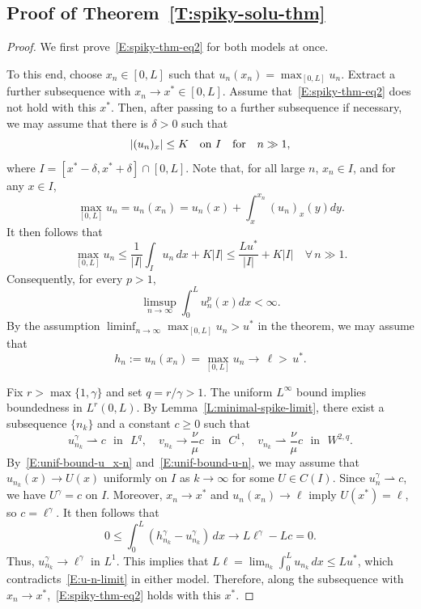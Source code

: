 \documentclass[11pt]{article} %
\theoremstyle{remark}
\theoremstyle{remark}
\numberwithin{equation}{section}
\numberwithin{figure}{section}
\numberwithin{table}{section}
\begin{document}
\subsection{Proof of Theorem~\ref{T:spiky-solu-thm}}


\begin{proof}
  We first prove~\eqref{E:spiky-thm-eq2} for both models at once.

  To this end, choose $x_n \in [0, L]$ such that $u_n(x_n) = \max_{[0,L]}u_n$.
  Extract a further subsequence with $x_n \to x^* \in [0, L]$. Assume
  that~\eqref{E:spiky-thm-eq2} does not hold with this $x^*$. Then, after
  passing to a further subsequence if necessary, we may assume that there is
  $\delta > 0$ such that
  \begin{equation}\label{E:unif-bound-u_x-n}
    |(u_n)_x|\le K\quad\text{on }I\quad {\rm for}\quad n\gg 1,
  \end{equation}
  where $I = [x^* - \delta, x^* + \delta]\cap[0, L]$. Note that, for all large
  $n$, $x_n \in I$, and for any $x \in I$,
  \[
    \max_{[0,L]}u_n=u_n(x_n)=u_n(x)+\int_x^{x_n}  (u_n)_x(y)dy.
  \]
  It then follows that
  \begin{equation}\label{E:unif-bound-u-n}
    \max_{[0,L]}u_n
    \le\frac1{|I|}\int_Iu_n\,dx+K|I|
    \le\frac{Lu^*}{|I|}+K|I|\quad \forall\, n\gg 1.
  \end{equation}
  Consequently, for every $p > 1$,
  \begin{equation}\label{E:lp-bound-u-n}
    \limsup_{n\to\infty} \int_0^L u_n^p(x)dx<\infty.
  \end{equation}
  By the assumption $ \liminf_{n\to\infty}\max_{[0,L]}u_n > u^*$ in the theorem,
  we may assume that
  \begin{equation}\label{E:u-n-limit}
    h_n:=u_n(x_n)=\max_{[0,L]}u_n\longrightarrow\, \ell{ > }\,u^*.
  \end{equation}

  Fix $r > \max\{1, \gamma\}$ and set $q = r/\gamma > 1$. The uniform $L^\infty$
  bound implies boundedness in $L^r(0, L)$. By
  Lemma~\ref{L:minimal-spike-limit}, there exist a subsequence $\{n_k\}$ and a
  constant $c \ge 0$ such that
  \begin{equation}\label{E:new-spike-limit}
    u_{n_k}^\gamma\rightharpoonup c\,\,\text{ in }\,\, L^q,
    \quad v_{n_k}\to\frac\nu\mu c\,\, \text{ in }\,\, C^1,
    \quad v_{n_k}\rightharpoonup\frac\nu\mu c\,\, \text{ in }\,\, W^{2,q}.
  \end{equation}
  By~\eqref{E:unif-bound-u_x-n} and~\eqref{E:unif-bound-u-n}, we may assume that
  $u_{n_k}(x) \to U(x)$ uniformly on $I$ as $k \to \infty$ for some $U \in
  C(I)$. Since $u_n^\gamma\rightharpoonup c$, we have $U^\gamma = c$ on $I$.
  Moreover, $x_n \to x^*$ and $u_n(x_n) \to \ell$ imply $U(x^*) = \ell$, so $c =
  \ell^\gamma$. It then follows that
  \[
    0\le\int_0^L(h_{n_k}^\gamma-u_{n_k}^\gamma)\,dx
    \longrightarrow L\ell^\gamma-Lc=0.
  \]
  Thus, $u_{n_k}^\gamma \to \ell^\gamma$ in $L^1$. This implies that $L\ell =
  \lim_{n_k}\int_0^L u_{n_k}\,dx \le Lu^*$, which
  contradicts~\eqref{E:u-n-limit} in either model. Therefore, along the
  subsequence with $x_n \to x^*$,~\eqref{E:spiky-thm-eq2} holds with this $x^*$.



\end{proof}
\end{document}

